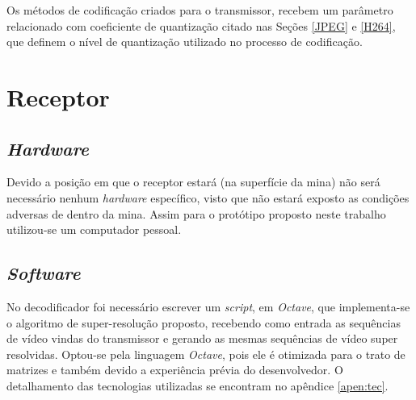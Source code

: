     Os métodos de codificação criados para o transmissor, recebem um parâmetro relacionado com coeficiente de quantização citado nas Seções \ref{JPEG} e \ref{H264}, que definem o nível de quantização utilizado no processo de codificação. 

\section{Receptor}

\subsection{\textit{Hardware}}

    Devido a posição em que o receptor estará (na superfície da mina) não será necessário nenhum \textit{hardware} específico, visto que não estará exposto as condições adversas de dentro da mina. Assim para o protótipo proposto neste trabalho utilizou-se um computador pessoal.

\subsection{\textit{Software}}

    No decodificador foi necessário escrever um \textit{script}, em \textit{Octave}, que implementa-se o algoritmo de super-resolução proposto, recebendo como entrada as sequências de vídeo vindas do transmissor e gerando as mesmas sequências de vídeo super resolvidas. Optou-se pela linguagem \textit{Octave}, pois ele é otimizada para o trato de matrizes e também devido a experiência prévia do desenvolvedor. O detalhamento das tecnologias utilizadas se encontram no apêndice \ref{apen:tec}. 

